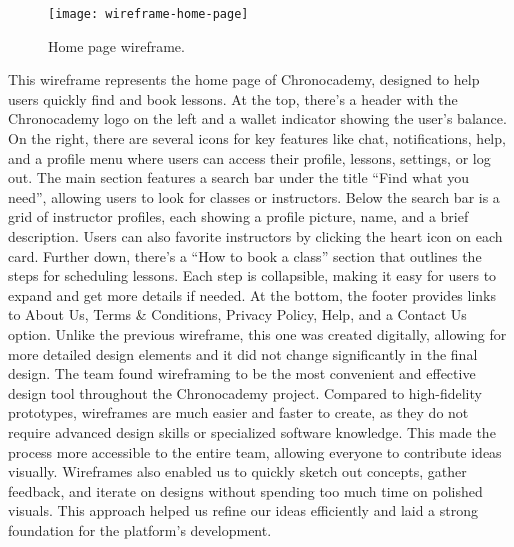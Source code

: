 \begin{figure}[h]
    \centering
    \texttt{[image: wireframe-home-page]}
    \caption{Home page wireframe.}
    \label{fig:figure10}
\end{figure}
This wireframe represents the home page of Chronocademy, designed to help users quickly find and book lessons.
At the top, there’s a header with the Chronocademy logo on the left and a wallet indicator showing the user's balance.
On the right, there are several icons for key features like chat, notifications, help, and a profile menu where users can access their profile, lessons, settings, or log out.
The main section features a search bar under the title ``Find what you need'', allowing users to look for classes or instructors.
Below the search bar is a grid of instructor profiles, each showing a profile picture, name, and a brief description.
Users can also favorite instructors by clicking the heart icon on each card.
Further down, there’s a ``How to book a class'' section that outlines the steps for scheduling lessons.
Each step is collapsible, making it easy for users to expand and get more details if needed.
At the bottom, the footer provides links to About Us, Terms \& Conditions, Privacy Policy, Help, and a Contact Us option.
Unlike the previous wireframe, this one was created digitally, allowing for more detailed design elements and it did not change significantly in the final design.\newline\newline
The team found wireframing to be the most convenient and effective design tool throughout the Chronocademy project.
Compared to high-fidelity prototypes, wireframes are much easier and faster to create, as they do not require advanced design skills or specialized software knowledge.
This made the process more accessible to the entire team, allowing everyone to contribute ideas visually.
Wireframes also enabled us to quickly sketch out concepts, gather feedback, and iterate on designs without spending too much time on polished visuals.
This approach helped us refine our ideas efficiently and laid a strong foundation for the platform’s development.